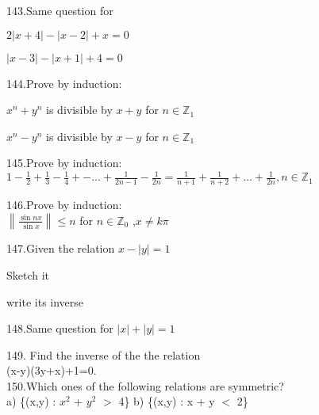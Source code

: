 \documentclass[11pt]{amsbook}
\begin{document}
143.Same question for \\

\begin{hEnumerateAlpha}
\item $ 2|x+4|-|x-2|+x=0$
\item $|x-3|-|x+1|+4=0$
\end{hEnumerateAlpha}

        144.Prove by induction:\\

\begin{hEnumerateAlpha}
\item $x^n+y^n$ is divisible by $x+y$ for $n\in \mathbb{Z}_1$
\item $x^n-y^n$ is divisible by $x-y$ for $n\in \mathbb{Z}_1$
\end{hEnumerateAlpha}

145.Prove by induction:\\

$1-\frac{1}{2}+\frac{1}{3}-\frac{1}{4}+ - \ldots +\frac{1}{2n-1} -\frac{1}{2n}=\frac{1}{n+1}+\frac{1}{n+2}+ \ldots +\frac{1}{2n},n\in \mathbb{Z}_1$ 


146.Prove by induction:\\

$ \left\| \frac{\sin nx}{\sin x} \right\| \leqslant n$ for $n\in \mathbb{Z}_0$ ,$ x \not= k\pi$


147.Given the relation $x-|y|=1$ \\

\begin{hEnumerateAlpha}
\item Sketch it
\item write its inverse
\end{hEnumerateAlpha}


148.Same question for $|x|+|y|=1$


149. Find the inverse of the the relation \\

\hspace{1 cm}(x-y)(3y+x)+1=0. \\

150.Which ones of the following relations are symmetric? \\

\hspace{1 cm} a) \{(x,y) : $x^{2}$ + $y^{2}$ $>$ 4\} \hspace{1 cm} b) \{(x,y) : x + y $<$ 2\}   \\
\end{document}
